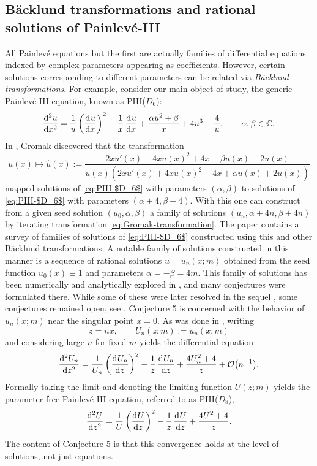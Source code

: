 \documentclass[pdftex]{sigma}
\numberwithin{equation}{section}
\newcommand{\C}{{\mathbb{C}}}
\begin{document}
\subsection{B\"acklund transformations and rational solutions of Painlev\'e-III}
All Painlev\'e equations but the first are actually families of differential equations indexed by complex parameters appearing as coefficients. However, certain solutions corresponding to different parameters can be related via \emph{B\"acklund transformations}. For example, consider our main object of study, the generic Painlev\'e III equation, known as PIII($D_6$):
\begin{equation}
\dod[2]{u}{x}=\dfrac{1}{u}\left( \dod{u}{x} \right)^2-\dfrac{1}{x} \dod{u}{x} + \dfrac{\alpha u^2 + \beta}{x}+4u^3-\frac{4}{u}, \qquad \alpha,\beta \in \C.
\label{eq:PIII-$D_6$}
\end{equation}
In \cite{Gromak}, Gromak discovered that the transformation
\begin{equation}
 u(x) \mapsto \hat{u}(x) := \dfrac{2xu'(x) + 4xu(x)^2 + 4x -\beta u(x) - 2u(x)}{u(x) ( 2xu'(x) + 4x u(x)^2 +4x + \alpha u(x) + 2u(x) )}
\label{eq:Gromak-transformation}
\end{equation}
mapped solutions of \eqref{eq:PIII-$D_6$} with parameters $(\alpha, \beta)$ to solutions of \eqref{eq:PIII-$D_6$} with parameters $(\alpha + 4,\allowbreak \beta+4)$. With this one can construct from a given seed solution $(u_0, \alpha, \beta)$ a family of solutions $(u_n, \alpha + 4n, \beta + 4n)$ by iterating transformation \eqref{eq:Gromak-transformation}. The paper \cite{MCB} contains a survey of families of solutions of \eqref{eq:PIII-$D_6$} constructed using this and other B\"acklund transformations. A notable family of solutions constructed in this manner is a sequence of rational solutions $u=u_n(x;m)$ obtained from the seed function $u_0(x) \equiv 1$ and parameters $\alpha = -\beta = 4m$. This family of solutions has been numerically and analytically explored in \cite{BMS18}, and many conjectures were formulated there. While some of these were later resolved in the sequel \cite{BM20}, some conjectures remained open, see \cite[Conjectures 4 and 5]{BMS18}. Conjecture 5 is concerned with the behavior of $u_n(x;m)$ near the singular point $x = 0$. As was done in \cite{BMS18}, writing \[z = nx,\qquad U_n(z;m):= u_n(x;m)\] and considering large $n$ for fixed $m$ yields the differential equation
\[
\dod[2]{U_n}{z} = \dfrac{1}{U_n} \left( \dod{U_n}{z}\right)^2 - \dfrac{1}{z} \dod{U_n}{z} + \dfrac{4U_n^2 + 4}{z} + \mathcal{O}\big(n^{-1}\big).
\]
Formally taking the limit and denoting the limiting function $U(z;m)$ yields the parameter-free Painlev\'e-III equation, referred to as PIII($D_8$),
\begin{equation}
\dod[2]{U}{z}=\dfrac{1}{U}\left( \dod{U}{z}\right)^2-\dfrac{1}{z} \dod{U}{z} + \dfrac{4U^2 + 4}{z}.
\label{eq:PIII-$D_8$}
\end{equation}
The content of Conjecture 5 is that this convergence holds at the level of solutions, not just equations.
\end{document}
